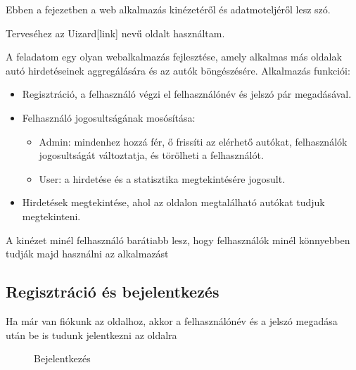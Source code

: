 Ebben a fejezetben a web alkalmazás kinézetéről és adatmoteljéről lesz szó.

Terveséhez az Uizard[link] nevű oldalt használtam.


A feladatom egy olyan webalkalmazás fejlesztése, amely alkalmas más oldalak autó hirdetéseinek aggregálására és az autók böngészésére. Alkalmazás funkciói:

\begin{itemize}
\item Regisztráció, a felhasználó végzi el felhasználónév és jelszó pár megadásával.
\item Felhasználó jogosultságának mosósítása:
	\begin{itemize}
	\item Admin: mindenhez hozzá fér, ő frissíti az elérhető autókat, felhasználók jogosultságát változtatja, és törölheti a felhasználót.
	\item User: a hirdetése és a statisztika megtekintésére jogosult.
	\end{itemize}
\item Hirdetések megtekintése, ahol az oldalon megtalálható autókat tudjuk megtekinteni.
\end{itemize}


A kinézet minél felhasználó barátiabb lesz, hogy felhasználók minél könnyebben tudják majd használni az alkalmazást

\subsection{Regisztráció és bejelentkezés}

Ha már van fiókunk az oldalhoz, akkor a felhasználónév és a jelszó megadása után be is tudunk jelentkezni az oldalra

\newpage

\begin{figure}[h]
\centering
{}
\caption{Bejelentkezés}
\label{fig:Bejelentkezés}
\end{figure}

